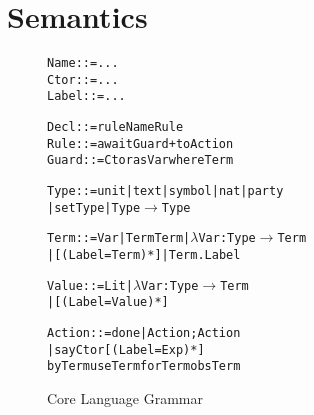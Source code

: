 
\clearpage{}
\section{Semantics}

\begin{figure}
\begin{small}
\begin{alltt}
Name   ::= ...
Ctor   ::= ...
Label  ::= ...

Decl   ::= rule Name Rule
Rule   ::= await Guard+ to Action
Guard  ::= Ctor as Var where Term

Type   ::= unit | text | symbol | nat | party
        |  set Type | Type \(\to\) Type

Term   ::= Var | Term Term | \(\lambda\) Var : Type \(\to\) Term
        |  [ (Label = Term)* ] | Term . Label

Value  ::= Lit | \(\lambda\) Var : Type \(\to\) Term
        |  [ (Label = Value)* ]

Action ::= done | Action ; Action
        |  say Ctor [ (Label = Exp)* ]
           by  Term  use Term  for Term  obs Term
\end{alltt}
\end{small}

\caption{Core Language Grammar}
\end{figure}


